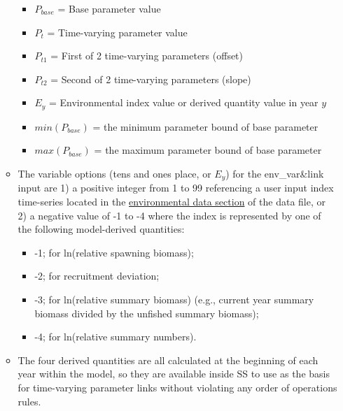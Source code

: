 \begin{itemize}
\begin{itemize}
\begin{itemize}
           \item $P_{base}$ = Base parameter value
           \item $P_{t}$ = Time-varying parameter value
           \item $P_{t1}$ = First of 2 time-varying parameters (offset)
           \item $P_{t2}$ = Second of 2 time-varying parameters (slope)
           \item $E_{y}$ = Environmental index value or derived quantity value in year $y$
           \item $min(P_{base})$ = the minimum parameter bound of base parameter
           \item $max(P_{base})$ = the maximum parameter bound of base parameter
        \end{itemize}
		\item The variable options (tens and ones place, or $E_{y}$) for the env\_var\&link input are 1) a positive integer from 1 to 99 referencing a user input index time-series located in the \hyperlink{env-dat}{environmental data section} of the data file, or 2) a negative value of -1 to -4 where the index is represented by one of the following model-derived quantities:
		\begin{itemize}
			\item -1;  for ln(relative spawning biomass);
			\item -2;  for recruitment deviation;
			\item -3;  for ln(relative summary biomass) (e.g., current year summary biomass divided by the unfished summary biomass);
			\item -4;  for ln(relative summary numbers).
		\end{itemize}
		\item The four derived quantities are all calculated at the beginning of each year within the model, so they are available inside SS to use as the basis for time-varying parameter links without violating any order of operations rules.
	\end{itemize}
	

\end{itemize}
